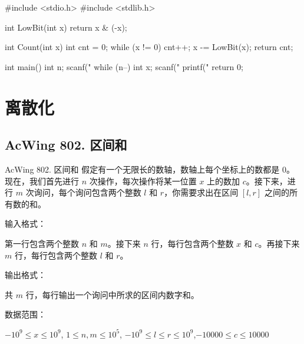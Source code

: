 \begin{mycpptwocol}[LowBit 运算]
    #include <stdio.h>
    #include <stdlib.h>

    int LowBit(int x) {
        return x & (-x);
    }

    int Count(int x) {
        int cnt = 0;
        while (x != 0) {
            cnt++;
            x -= LowBit(x);
        }
        return cnt;
    }

    int main() {
        int n;
        scanf("%
        while (n--) {
            int x;
            scanf("%
            printf("%
        }
        return 0;
    }
\end{mycpptwocol}


\section{离散化}

\subsection{AcWing 802. 区间和}
\begin{titledbox}{AcWing 802. 区间和}
    假定有一个无限长的数轴，数轴上每个坐标上的数都是 $0$。现在，我们首先进行 $n$ 次操作，每次操作将某一位置 $x$ 上的数加 $c$。接下来，进行 $m$ 次询问，每个询问包含两个整数 $l$ 和 $r$，你需要求出在区间 $[l, r]$ 之间的所有数的和。

    输入格式：

    第一行包含两个整数 $n$ 和 $m$。接下来 $n$ 行，每行包含两个整数 $x$ 和 $c$。再接下来 $m$ 行，每行包含两个整数 $l$ 和 $r$。

    输出格式：

    共 $m$ 行，每行输出一个询问中所求的区间内数字和。

    数据范围：

    $-10^9 \le x \le 10^9$, $1 \le n,m \le 10^5$, $-10^9 \le l \le r \le 10^9$,$-10000 \le c \le 10000$

    \begin{inputblock}
         \\
         \\
         \\
         \\
         \\
         \\
    \end{inputblock}
    \begin{outputblock}
         \\
         \\
    \end{outputblock}
\end{titledbox}


